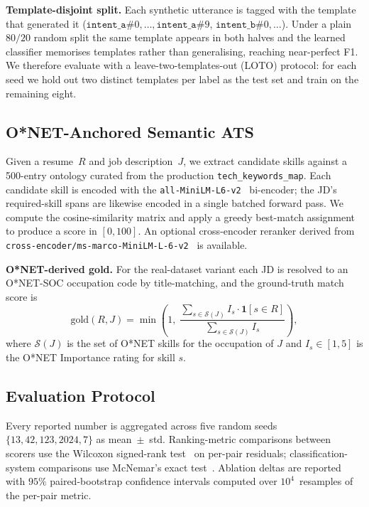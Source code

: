\documentclass[conference]{IEEEtran}
\begin{document}
\noindent\textbf{Template-disjoint split.} Each synthetic utterance is
tagged with the template that generated it
($\texttt{intent\_a}\#0,\ldots,\texttt{intent\_a}\#9$,
$\texttt{intent\_b}\#0,\ldots$). Under a plain $80/20$ random split the
same template appears in both halves and the learned classifier
memorises templates rather than generalising, reaching near-perfect
F1. We therefore evaluate with a leave-two-templates-out (LOTO)
protocol: for each seed we hold out two distinct templates per label as
the test set and train on the remaining eight.

\subsection{O*NET-Anchored Semantic ATS}\label{sec:methods:ats}
Given a resume~$R$ and job description~$J$, we extract candidate skills
against a 500-entry ontology curated from the production
\texttt{tech\_keywords\_map}. Each candidate skill is encoded with the
\texttt{all-MiniLM-L6-v2}~\cite{reimers2019sentence} bi-encoder; the
JD's required-skill spans are likewise encoded in a single batched
forward pass. We compute the cosine-similarity matrix and apply a
greedy best-match assignment to produce a score in $[0,100]$. An
optional cross-encoder reranker derived from
\texttt{cross-encoder/ms-marco-MiniLM-L-6-v2}~\cite{nogueira2019passage}
is available.

\noindent\textbf{O*NET-derived gold.} For the real-dataset variant each
JD is resolved to an O*NET-SOC occupation code by title-matching, and
the ground-truth match score is
\[
\mathrm{gold}(R,J)=\min\!\left(1,\;
\frac{\sum_{s\in\mathcal{S}(J)} I_s\cdot\mathbf{1}[s\in R]}
     {\sum_{s\in\mathcal{S}(J)} I_s}\right),
\]
where $\mathcal{S}(J)$ is the set of O*NET skills for the occupation of
$J$ and $I_s\in[1,5]$ is the O*NET Importance rating for skill $s$.

\subsection{Evaluation Protocol}\label{sec:methods:eval}
Every reported number is aggregated across five random seeds
$\{13,42,123,2024,7\}$ as mean~$\pm$~std. Ranking-metric comparisons
between scorers use the Wilcoxon signed-rank
test~\cite{wilcoxon1945individual} on per-pair residuals;
classification-system comparisons use McNemar's exact
test~\cite{mcnemar1947note}. Ablation deltas are reported with
$95\%$ paired-bootstrap confidence intervals computed over
$10^4$~resamples of the per-pair metric.
\end{document}

